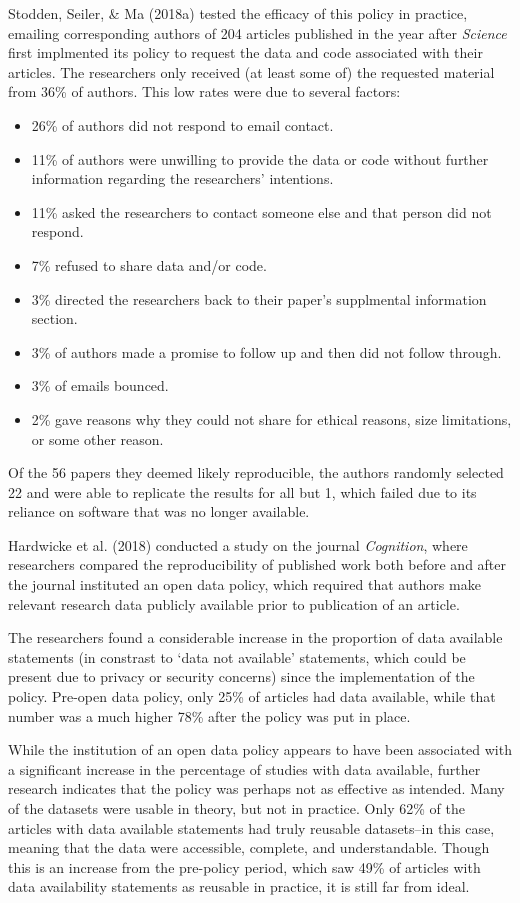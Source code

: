 \documentclass[12pt,twoside]{reedthesis}
\providecommand{\tightlist}{%
  \setlength{\itemsep}{0pt}\setlength{\parskip}{0pt}}
\begin{document}
Stodden, Seiler, \& Ma (2018a) tested the efficacy of this policy in
practice, emailing corresponding authors of 204 articles published in
the year after \emph{Science} first implmented its policy to request the
data and code associated with their articles. The researchers only
received (at least some of) the requested material from 36\% of authors.
This low rates were due to several factors:
\begin{itemize}
\tightlist
\item
  26\% of authors did not respond to email contact.
\item
  11\% of authors were unwilling to provide the data or code without
  further information regarding the researchers' intentions.
\item
  11\% asked the researchers to contact someone else and that person did
  not respond.
\item
  7\% refused to share data and/or code.
\item
  3\% directed the researchers back to their paper's supplmental
  information section.
\item
  3\% of authors made a promise to follow up and then did not follow
  through.
\item
  3\% of emails bounced.
\item
  2\% gave reasons why they could not share for ethical reasons, size
  limitations, or some other reason.
\end{itemize}
Of the 56 papers they deemed likely reproducible, the authors randomly
selected 22 and were able to replicate the results for all but 1, which
failed due to its reliance on software that was no longer available.

Hardwicke et al. (2018) conducted a study on the journal
\emph{Cognition}, where researchers compared the reproducibility of
published work both before and after the journal instituted an open data
policy, which required that authors make relevant research data publicly
available prior to publication of an article.

The researchers found a considerable increase in the proportion of data
available statements (in constrast to `data not available' statements,
which could be present due to privacy or security concerns) since the
implementation of the policy. Pre-open data policy, only 25\% of
articles had data available, while that number was a much higher 78\%
after the policy was put in place.

While the institution of an open data policy appears to have been
associated with a significant increase in the percentage of studies with
data available, further research indicates that the policy was perhaps
not as effective as intended. Many of the datasets were usable in
theory, but not in practice. Only 62\% of the articles with data
available statements had truly reusable datasets--in this case, meaning
that the data were accessible, complete, and understandable. Though this
is an increase from the pre-policy period, which saw 49\% of articles
with data availability statements as reusable in practice, it is still
far from ideal.
\end{document}

